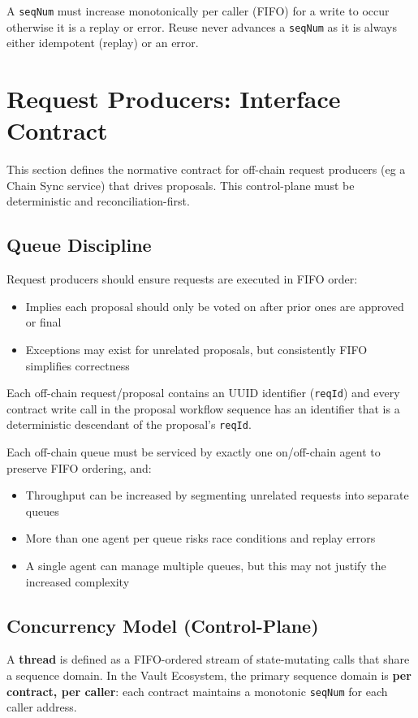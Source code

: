 \documentclass[10pt]{article}
\begin{document}
A \texttt{seqNum} must increase monotonically per caller (FIFO) for a write to occur otherwise it is a replay or error.
Reuse never advances a \texttt{seqNum} as it is always either idempotent (replay) or an error.

\clearpage
\section{Request Producers: Interface Contract}
This section defines the normative contract for off-chain request producers (eg a Chain Sync service) that drives proposals. This control-plane must be deterministic and reconciliation-first.

\subsection{Queue Discipline}
Request producers should ensure requests are executed in FIFO order:
\begin{itemize}
    \item Implies each proposal should only be voted on after prior ones are approved or final
    \item Exceptions may exist for unrelated proposals, but consistently FIFO simplifies correctness
\end{itemize}

Each off-chain request/proposal contains an UUID identifier (\texttt{reqId}) and every contract write call in the proposal workflow sequence has an identifier that is a deterministic descendant of the proposal's \texttt{reqId}.

Each off-chain queue must be serviced by exactly one on/off-chain agent to preserve FIFO ordering, and:
\begin{itemize}
    \item Throughput can be increased by segmenting unrelated requests into separate queues
    \item More than one agent per queue risks race conditions and replay errors
    \item A single agent can manage multiple queues, but this may not justify the increased complexity
\end{itemize}

\subsection{Concurrency Model (Control-Plane)}
A \textbf{thread} is defined as a FIFO-ordered stream of state-mutating calls that share a sequence domain.
In the Vault Ecosystem, the primary sequence domain is \textbf{per contract, per caller}:
each contract maintains a monotonic \texttt{seqNum} for each caller address.
\end{document}
